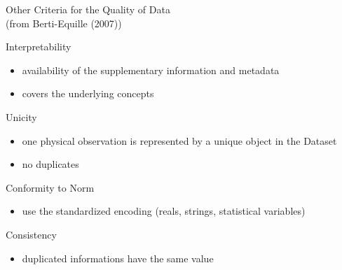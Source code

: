 \documentclass[xcolor=x11names,compress,8pt,
handout
]{beamer}
\renewcommand{\(}{\begin{columns}}
\renewcommand{\)}{\end{columns}}
\newcommand{\<}[1]{\begin{column}{#1}}
\renewcommand{\>}{\end{column}}
\begin{document}
\begin{frame}{Other Criteria for the Quality of Data \\(from Berti-Equille (2007))}
\begin{alertblock}{Interpretability}
\begin{itemize}
\item availability of the supplementary information and metadata
\item covers the underlying concepts
\end{itemize}
\end{alertblock}
\begin{alertblock}{Unicity}
\begin{itemize}
\item one physical observation is represented by a unique object in the Dataset
\item no duplicates
\end{itemize}
\end{alertblock}
\begin{alertblock}{Conformity to Norm}
\begin{itemize}
\item use the standardized encoding (reals, strings, statistical variables)
\end{itemize}
\end{alertblock}
\begin{alertblock}{Consistency}
\begin{itemize}
\item duplicated informations have the same value 
\end{itemize}
\end{alertblock}
\end{frame}
\end{document}
